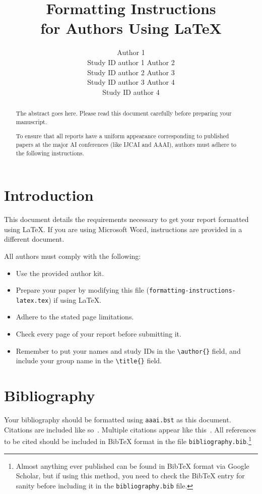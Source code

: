 \documentclass[letterpaper]{article}
\begin{document}
\title{Formatting Instructions \\for Authors Using \LaTeX{}}
\author{Author 1 \\ Study ID author 1 \And Author 2 \\ Study ID author 2 \And Author 3 \\ Study ID author 3 \And Author 4 \\ Study ID author 4}
\maketitle
\begin{abstract}
The abstract goes here. Please read this document carefully before preparing your manuscript.

To ensure that all reports have a uniform appearance corresponding to published papers at the major AI conferences (like IJCAI and AAAI), authors must adhere to the following instructions. 
\end{abstract}

\section{Introduction}
This document details the requirements necessary to get your report formatted using \LaTeX{}. If you are using Microsoft Word, instructions are provided in a different document. 

All authors must comply with the following:

\begin{itemize}
\item Use the provided author kit.
\item Prepare your paper by modifying this file (\texttt{formatting-instructions-latex.tex}) if using \LaTeX{}.
\item Adhere to the stated page limitations.
\item Check every page of your report before submitting it.
\item Remember to put your names and study IDs in the \verb|\author{}| field, and include your group name in the \verb|\title{}| field.
\end{itemize}

\section{Bibliography}
Your bibliography should be formatted using \texttt{aaai.bst} as this document. Citations are included like so~\cite{book2015}. Multiple citations appear like this~\cite{conf,article}. All references to be cited should be included in BibTeX format in the file \texttt{bibliography.bib}.\footnote{Almost anything ever published can be found in BibTeX format via Google Scholar, but if using this method, you need to check the BibTeX entry for sanity before including it in the \texttt{bibliography.bib} file.}
\end{document}
